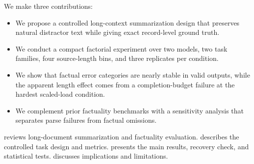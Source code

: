 We make three contributions:
\begin{itemize}[leftmargin=*,itemsep=0pt,topsep=0pt]
    \item We propose a controlled long-context summarization design that preserves natural distractor text while giving exact record-level ground truth.
    \item We conduct a compact factorial experiment over two models, two task families, four source-length bins, and three replicates per condition.
    \item We show that factual error categories are nearly stable in valid outputs, while the apparent length effect comes from a completion-budget failure at the hardest scaled-load condition.
    \item We complement prior factuality benchmarks with a sensitivity analysis that separates parse failures from factual omissions.
\end{itemize}

 reviews long-document summarization and factuality evaluation.  describes the controlled task design and metrics.  presents the main results, recovery check, and statistical tests.  discusses implications and limitations.
